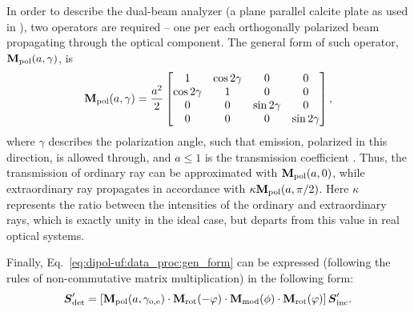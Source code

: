 In order to describe the dual-beam analyzer (a plane parallel calcite plate as used in \DUF), two operators are required -- one per each orthogonally polarized beam propagating through the optical component.
The general form of such operator, $\mathbf{M}_{\mathrm{pol}}(a, \gamma)$, is
\begin{equation}
    \mathbf{M}_{\mathrm{pol}}(a, \gamma) = 
    \frac{a^2}{2}
    \begin{bmatrix}
        1 & \cos2\gamma & 0 & 0 \\
        \cos2\gamma & 1 & 0 & 0 \\
        0 & 0 & \sin2\gamma & 0 \\
        0 & 0 & 0 & \sin2\gamma \\
    \end{bmatrix},
\end{equation}
where $\gamma$ describes the polarization angle, such that emission, polarized in this direction, is allowed through, and $a \le 1$ is the transmission coefficient \citep{Piirola_Thesis, PolarizedLight2}.
Thus, the transmission of ordinary ray can be approximated with $\mathbf{M}_{\mathrm{pol}}(a, 0)$, while extraordinary ray propagates in accordance with $\kappa \mathbf{M}_{\mathrm{pol}}(a, \pi/2)$.
Here $\kappa$ represents the ratio between the intensities of the ordinary and extraordinary rays, which is exactly unity in the ideal case, but departs from this value in real optical systems.

Finally, Eq.~\ref{eq:dipol-uf:data_proc:gen_form} can be expressed (following the rules of non-commutative matrix multiplication) in the following form:
\begin{equation}
    \label{eq:dipol-uf:final_relation}
    \boldsymbol{S}_{\mathrm{det}}^\prime =  \left[\mathbf{M}_{\mathrm{pol}}(a, \gamma_{\mathrm{o,e}})\cdot \mathbf{M}_{\mathrm{rot}}(-\varphi) \cdot \mathbf{M}_{\mathrm{mod}}(\phi) \cdot \mathbf{M}_{\mathrm{rot}}(\varphi)\right] \boldsymbol{S}_{\mathrm{inc}}^\prime.
\end{equation}


